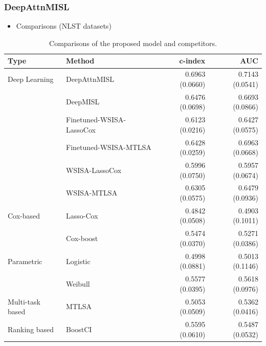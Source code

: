 \documentclass{beamer}
\begin{document}
	\begin{frame}
		\frametitle{DeepAttnMISL}
		\begin{itemize}					
			\item Comparisons (NLST datasets) \\
		\end{itemize}
		
		\begin{table}[H]
			\footnotesize
			\begin{center}
				\begin{tabular}{ l l r r  }
					\hline
					Type & Method & c-index & AUC \\
					\hline
					Deep Learning & DeepAttnMISL & 0.6963 (0.0660) & 0.7143 (0.0541) \\
					& DeepMISL & 0.6476 (0.0698) & 0.6693 (0.0866) \\
					& Finetuned-WSISA-LassoCox & 0.6123 (0.0216) & 0.6427 (0.0575) \\
					& Finetuned-WSISA-MTLSA & 0.6428 (0.0259) &	0.6963 (0.0668) \\
					& WSISA-LassoCox & 0.5996 (0.0750) &	0.5957 (0.0674) \\
					& WSISA-MTLSA & 0.6305 (0.0575) & 0.6479 (0.0936) \\
					Cox-based & Lasso-Cox & 0.4842 (0.0508)	& 0.4903 (0.1011) \\
					& Cox-boost & 0.5474 (0.0370) & 0.5271 (0.0386) \\
					Parametric & Logistic &	0.4998 (0.0881) &	0.5013 (0.1146) \\
					& Weibull & 0.5577 (0.0395) & 0.5618 (0.0976) \\
					Multi-task based & MTLSA & 0.5053 (0.0509) & 0.5362 (0.0416) \\
					Ranking based & BoostCI & 0.5595 (0.0610) &	0.5487 (0.0532) \\
					\hline
				\end{tabular}
			\end{center}
			\caption{Comparisons of the proposed model and competitors.}
		\end{table} 
	\end{frame}
	
\end{document}
